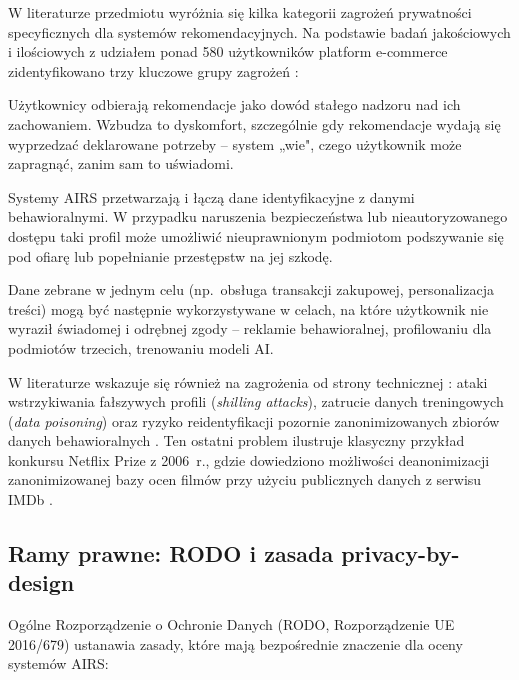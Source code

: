 \documentclass[12pt, a4paper]{article}
\begin{document}
W literaturze przedmiotu wyróżnia się kilka kategorii zagrożeń prywatności specyficznych dla systemów rekomendacyjnych. Na podstawie badań jakościowych i ilościowych z udziałem ponad 580 użytkowników platform e-commerce zidentyfikowano trzy kluczowe grupy zagrożeń \cite{chen2025}:

\begin{description}[leftmargin=1.5em, style=nextline]
  \item[Poczucie bycia obserwowanym (\textit{perceived surveillance})]
    Użytkownicy odbierają rekomendacje jako dowód stałego nadzoru nad ich zachowaniem. Wzbudza to dyskomfort, szczególnie gdy rekomendacje wydają się wyprzedzać deklarowane potrzeby -- system „wie", czego użytkownik może zapragnąć, zanim sam to uświadomi.
  \item[Zagrożenie kradzieżą tożsamości (\textit{perceived identity theft})]
    Systemy AIRS przetwarzają i łączą dane identyfikacyjne z danymi behawioralnymi. W przypadku naruszenia bezpieczeństwa lub nieautoryzowanego dostępu taki profil może umożliwić nieuprawnionym podmiotom podszywanie się pod ofiarę lub popełnianie przestępstw na jej szkodę.
  \item[Nieuprawnione wtórne wykorzystanie danych (\textit{perceived unauthorized secondary use})]
    Dane zebrane w jednym celu (np.\ obsługa transakcji zakupowej, personalizacja treści) mogą być następnie wykorzystywane w celach, na które użytkownik nie wyraził świadomej i odrębnej zgody -- reklamie behawioralnej, profilowaniu dla podmiotów trzecich, trenowaniu modeli AI.
\end{description}

W literaturze wskazuje się również na zagrożenia od strony technicznej \cite{himeur2022}: ataki wstrzykiwania fałszywych profili (\textit{shilling attacks}), zatrucie danych treningowych (\textit{data poisoning}) oraz ryzyko reidentyfikacji pozornie zanonimizowanych zbiorów danych behawioralnych \cite{himeur2022, narayanan2008}. Ten ostatni problem ilustruje klasyczny przykład konkursu Netflix Prize z 2006~r., gdzie dowiedziono możliwości deanonimizacji zanonimizowanej bazy ocen filmów przy użyciu publicznych danych z serwisu IMDb \cite{narayanan2008}.

\subsection{Ramy prawne: RODO i zasada privacy-by-design}

Ogólne Rozporządzenie o Ochronie Danych (RODO, Rozporządzenie UE 2016/679) \cite{rodo} ustanawia zasady, które mają bezpośrednie znaczenie dla oceny systemów AIRS:
\end{document}

